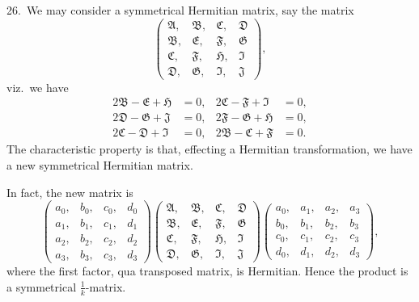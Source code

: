 \documentclass[11pt,a4paper]{book}
\begin{document}
26.\ We may consider a symmetrical Hermitian matrix, say the matrix
\[
\begin{pmatrix}
\mathfrak{A}, & \mathfrak{B}, & \mathfrak{C}, & \mathfrak{D}\\
\mathfrak{B}, & \mathfrak{E}, & \mathfrak{F}, & \mathfrak{G}\\
\mathfrak{C}, & \mathfrak{F}, & \mathfrak{H}, & \mathfrak{I}\\
\mathfrak{D}, & \mathfrak{G}, & \mathfrak{I}, & \mathfrak{J}
\end{pmatrix},
\]
viz.\ we have
\begin{align*}
2\mathfrak{B} - \mathfrak{E} + \mathfrak{H} &= 0, & 2\mathfrak{C} - \mathfrak{F} + \mathfrak{I} &= 0,\\
2\mathfrak{D} - \mathfrak{G} + \mathfrak{J} &= 0, & 2\mathfrak{F} - \mathfrak{G} + \mathfrak{H} &= 0,\\
2\mathfrak{C} - \mathfrak{D} + \mathfrak{I} &= 0, & 2\mathfrak{B} - \mathfrak{C} + \mathfrak{F} &= 0.
\end{align*}
The characteristic property is that, effecting a Hermitian transformation, we have a new symmetrical Hermitian matrix.

In fact, the new matrix is
\[
\begin{pmatrix}
a_0, & b_0, & c_0, & d_0\\
a_1, & b_1, & c_1, & d_1\\
a_2, & b_2, & c_2, & d_2\\
a_3, & b_3, & c_3, & d_3
\end{pmatrix}
\begin{pmatrix}
\mathfrak{A}, & \mathfrak{B}, & \mathfrak{C}, & \mathfrak{D}\\
\mathfrak{B}, & \mathfrak{E}, & \mathfrak{F}, & \mathfrak{G}\\
\mathfrak{C}, & \mathfrak{F}, & \mathfrak{H}, & \mathfrak{I}\\
\mathfrak{D}, & \mathfrak{G}, & \mathfrak{I}, & \mathfrak{J}
\end{pmatrix}
\begin{pmatrix}
a_0, & a_1, & a_2, & a_3\\
b_0, & b_1, & b_2, & b_3\\
c_0, & c_1, & c_2, & c_3\\
d_0, & d_1, & d_2, & d_3
\end{pmatrix},
\]
where the first factor, qua transposed matrix, is Hermitian. Hence the product is a symmetrical $\frac{1}{k}$-matrix.

\medskip
\end{document}
